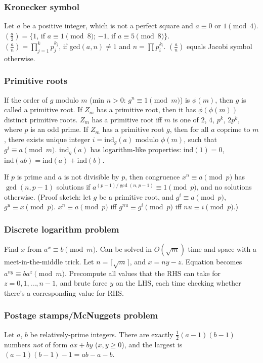 \begin{small}
\subsubsection{Kronecker symbol}
Let $a$ be a positive integer, which is not a perfect square and
$a \equiv 0$ or $1 {\pmod 4}$. \\
$\left(\frac{a}{2}\right) = \{ 1$, if $a \equiv 1 {\pmod 8}$;
$-1$, if $a \equiv 5 {\pmod 8} \}$. \\
$\left(\frac{a}{n}\right) = \prod_{j=1}^k p_j^{k_j}$,
if gcd$(a,n) \ne 1$ and $n=\prod p_i^{k_i}$.
$\left(\frac{a}{n}\right)$ equals Jacobi symbol otherwise.

\subsubsection{Primitive roots}  If the order of $g$ modulo $m$ (min $n>0$:
$g^n \equiv 1 \pmod{m}$) is $\phi(m)$, then $g$ is called a primitive root.
If $Z_m$ has a primitive root, then it has $\phi(\phi(m))$ distinct primitive
roots. $Z_m$ has a primitive root iff $m$ is one of $2$, $4$,
$p^k$, $2p^k$, where $p$ is an odd prime.
If $Z_m$ has a primitive root $g$, then for all $a$ coprime to $m$,
there exists unique integer $i=\text{ind}_g(a)$ modulo $\phi(m)$,
such that $g^i \equiv a \pmod{m}$.
$\text{ind}_g(a)$ has logarithm-like properties:
$\text{ind}(1) = 0$, $\text{ind}(ab) = \text{ind}(a) + \text{ind}(b)$.

If $p$ is prime and $a$ is not divisible by $p$, then congruence
$x^n \equiv a \pmod{p}$ has $\gcd(n, p-1)$ solutions if
$a^{(p-1)/\gcd(n,p-1)} \equiv 1 \pmod{p}$, and no solutions otherwise.
(Proof sketch: let $g$ be a primitive root, and
$g^i \equiv a \pmod{p}$, $g^u \equiv x \pmod{p}$.
$x^n \equiv a \pmod{p}$ iff $g^{nu} \equiv g^i \pmod{p}$ iff $nu \equiv i \pmod{p}$.)

\subsubsection{Discrete logarithm problem}  Find $x$ from $a^x \equiv b \pmod{m}$.
Can be solved in $O(\sqrt{m})$ time and space with a meet-in-the-middle trick.
Let $n = \lceil \sqrt{m} \rceil$, and $x = ny - z$.
Equation becomes $a^{ny} \equiv b a^z \pmod{m}$.  Precompute all values that
the RHS can take for $z = 0, 1, \dots, n-1$, and brute force $y$ on the LHS,
each time checking whether there's a corresponding value for RHS.

\subsubsection{Postage stamps/McNuggets problem}  Let $a$, $b$ be relatively-prime integers.
There are exactly $\frac{1}{2}(a-1)(b-1)$ numbers \emph{not} of form $ax+by$ ($x,y \ge 0$),
and the largest is $(a-1)(b-1)-1 = ab - a - b$.


\end{small}
